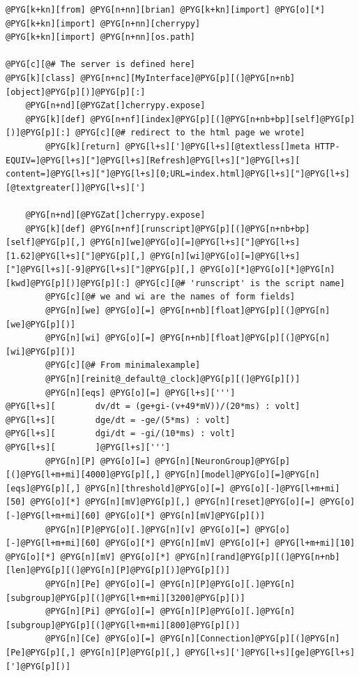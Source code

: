 \documentclass[letterpaper,10pt,english]{manual}
\begin{document}
\begin{Verbatim}[commandchars=@\[\]]
@PYG[k+kn][from] @PYG[n+nn][brian] @PYG[k+kn][import] @PYG[o][*]
@PYG[k+kn][import] @PYG[n+nn][cherrypy]
@PYG[k+kn][import] @PYG[n+nn][os.path]

@PYG[c][@# The server is defined here]
@PYG[k][class] @PYG[n+nc][MyInterface]@PYG[p][(]@PYG[n+nb][object]@PYG[p][)]@PYG[p][:]
    @PYG[n+nd][@PYGZat[]cherrypy.expose]
    @PYG[k][def] @PYG[n+nf][index]@PYG[p][(]@PYG[n+nb+bp][self]@PYG[p][)]@PYG[p][:] @PYG[c][@# redirect to the html page we wrote]
        @PYG[k][return] @PYG[l+s][']@PYG[l+s][@textless[]meta HTTP-EQUIV=]@PYG[l+s]["]@PYG[l+s][Refresh]@PYG[l+s]["]@PYG[l+s][ content=]@PYG[l+s]["]@PYG[l+s][0;URL=index.html]@PYG[l+s]["]@PYG[l+s][@textgreater[]]@PYG[l+s][']

    @PYG[n+nd][@PYGZat[]cherrypy.expose]
    @PYG[k][def] @PYG[n+nf][runscript]@PYG[p][(]@PYG[n+nb+bp][self]@PYG[p][,] @PYG[n][we]@PYG[o][=]@PYG[l+s]["]@PYG[l+s][1.62]@PYG[l+s]["]@PYG[p][,] @PYG[n][wi]@PYG[o][=]@PYG[l+s]["]@PYG[l+s][-9]@PYG[l+s]["]@PYG[p][,] @PYG[o][*]@PYG[o][*]@PYG[n][kwd]@PYG[p][)]@PYG[p][:] @PYG[c][@# 'runscript' is the script name]
        @PYG[c][@# we and wi are the names of form fields]
        @PYG[n][we] @PYG[o][=] @PYG[n+nb][float]@PYG[p][(]@PYG[n][we]@PYG[p][)]
        @PYG[n][wi] @PYG[o][=] @PYG[n+nb][float]@PYG[p][(]@PYG[n][wi]@PYG[p][)]
        @PYG[c][@# From minimalexample]
        @PYG[n][reinit@_default@_clock]@PYG[p][(]@PYG[p][)]
        @PYG[n][eqs] @PYG[o][=] @PYG[l+s][''']
@PYG[l+s][        dv/dt = (ge+gi-(v+49*mV))/(20*ms) : volt]
@PYG[l+s][        dge/dt = -ge/(5*ms) : volt]
@PYG[l+s][        dgi/dt = -gi/(10*ms) : volt]
@PYG[l+s][        ]@PYG[l+s][''']
        @PYG[n][P] @PYG[o][=] @PYG[n][NeuronGroup]@PYG[p][(]@PYG[l+m+mi][4000]@PYG[p][,] @PYG[n][model]@PYG[o][=]@PYG[n][eqs]@PYG[p][,] @PYG[n][threshold]@PYG[o][=] @PYG[o][-]@PYG[l+m+mi][50] @PYG[o][*] @PYG[n][mV]@PYG[p][,] @PYG[n][reset]@PYG[o][=] @PYG[o][-]@PYG[l+m+mi][60] @PYG[o][*] @PYG[n][mV]@PYG[p][)]
        @PYG[n][P]@PYG[o][.]@PYG[n][v] @PYG[o][=] @PYG[o][-]@PYG[l+m+mi][60] @PYG[o][*] @PYG[n][mV] @PYG[o][+] @PYG[l+m+mi][10] @PYG[o][*] @PYG[n][mV] @PYG[o][*] @PYG[n][rand]@PYG[p][(]@PYG[n+nb][len]@PYG[p][(]@PYG[n][P]@PYG[p][)]@PYG[p][)]
        @PYG[n][Pe] @PYG[o][=] @PYG[n][P]@PYG[o][.]@PYG[n][subgroup]@PYG[p][(]@PYG[l+m+mi][3200]@PYG[p][)]
        @PYG[n][Pi] @PYG[o][=] @PYG[n][P]@PYG[o][.]@PYG[n][subgroup]@PYG[p][(]@PYG[l+m+mi][800]@PYG[p][)]
        @PYG[n][Ce] @PYG[o][=] @PYG[n][Connection]@PYG[p][(]@PYG[n][Pe]@PYG[p][,] @PYG[n][P]@PYG[p][,] @PYG[l+s][']@PYG[l+s][ge]@PYG[l+s][']@PYG[p][)]

\end{Verbatim}
\end{document}
